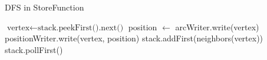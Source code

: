\begin{algorithm}
    \caption{DFS in StoreFunction}
    \begin{algorithmic}
                \State $\text{vertex} \gets \text{stack.peekFirst().next()}$
                    \State position $\gets$ arcWriter.write(vertex)
                    \State positionWriter.write(vertex, position)
                    \State stack.addFirst(neighbors(vertex))
                \EndIf
            \Else
                \State stack.pollFirst()
            \EndIf
        \EndWhile
        \EndProcedure      
    \end{algorithmic}
    \label{alg:store_dfs}
\end{algorithm}
